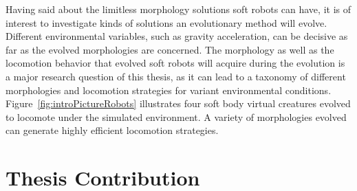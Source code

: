 Having said about the limitless morphology solutions soft robots can have, it is of interest to investigate kinds of solutions an evolutionary method will evolve. Different environmental variables, such as gravity acceleration, can be decisive as far as the evolved morphologies are concerned. The morphology as well as the locomotion behavior that evolved soft robots will acquire during the evolution is a major research question of this thesis, as it can lead to a taxonomy of different morphologies and locomotion strategies for variant environmental conditions. Figure~\ref{fig:introPictureRobots} illustrates four soft body virtual creatures evolved to locomote under the simulated environment. A variety of morphologies evolved can generate highly efficient locomotion strategies.


\section{Thesis Contribution}

